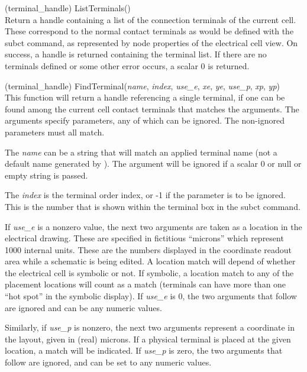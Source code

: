 \begin{description}
\item{(terminal\_handle) \vt ListTerminals()}\\
Return a handle containing a list of the connection terminals of the
current cell.  These correspond to the normal contact terminals as
would be defined with the {\cb subct} command, as represented by {\et
node} properties of the electrical cell view.  On success, a handle is
returned containing the terminal list.  If there are no terminals
defined or some other error occurs, a scalar 0 is returned.

\item{(terminal\_handle) \vt FindTerminal({\it name\/}, {\it index\/},
 {\it use\_e\/}, {\it xe\/}, {\it ye\/}, {\it use\_p\/}, {\it xp\/},
 {\it yp\/})}\\
This function will return a handle referencing a single terminal, if
one can be found among the current cell contact terminals that matches
the arguments.  The arguments specify parameters, any of which can be
ignored.  The non-ignored parameters must all match.

The {\it name} can be a string that will match an applied terminal
name (not a default name generated by {\Xic}).  The argument will be
ignored if a scalar 0 or null or empty string is passed.

The {\it index} is the terminal order index, or -1 if the parameter is
to be ignored.  This is the number that is shown within the terminal
box in the {\cb subct} command.

If {\it use\_e} is a nonzero value, the next two arguments are taken
as a location in the electrical drawing.  These are specified in
fictitious ``microns'' which represent 1000 internal units.  These are
the numbers displayed in the coordinate readout area while a schematic
is being edited.  A location match will depend of whether the
electrical cell is symbolic or not.  If symbolic, a location match to
any of the placement locations will count as a match (terminals can
have more than one ``hot spot'' in the symbolic display).  If {\it
use\_e} is 0, the two arguments that follow are ignored and can be any
numeric values.

Similarly, if {\it use\_p} is nonzero, the next two arguments
represent a coordinate in the layout, given in (real) microns.  If a
physical terminal is placed at the given location, a match will be
indicated.  If {\it use\_p} is zero, the two arguments that follow are
ignored, and can be set to any numeric values.


\end{description}
